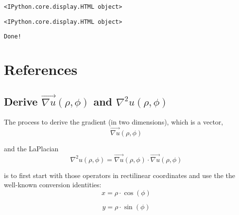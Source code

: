 \documentclass[11pt]{article}
\begin{document}
    
    
    \begin{Verbatim}[commandchars=\\\{\}]
<IPython.core.display.HTML object>
    \end{Verbatim}

    
    
    \begin{Verbatim}[commandchars=\\\{\}]
<IPython.core.display.HTML object>
    \end{Verbatim}

    
    \begin{Verbatim}[commandchars=\\\{\}]
Done!
    \end{Verbatim}

    \hypertarget{references}{%
\section{References}\label{references}}

    \hypertarget{derive-vecnabla-urho-phi-and-nabla2-urho-phi}{%
\subsection{\texorpdfstring{Derive \(\vec{\nabla u}(\rho, \phi)\) and
\(\nabla^2 u(\rho, \phi)\)}{Derive \textbackslash vec\{\textbackslash nabla u\}(\textbackslash rho, \textbackslash phi) and \textbackslash nabla\^{}2 u(\textbackslash rho, \textbackslash phi)}}\label{derive-vecnabla-urho-phi-and-nabla2-urho-phi}}

    The process to derive the gradient (in two dimensions), which is a
vector, \begin{equation}
\vec{\nabla u}(\rho,\phi)
\label{eq:eq1} \tag{1}
\end{equation}

and the LaPlacian \begin{equation}
\nabla^2 u(\rho,\phi) = \vec{\nabla u}(\rho,\phi) \cdot \vec{\nabla u}(\rho,\phi)
\label{eq:eq2} \tag{2}
\end{equation}

is to first start with those operators in rectilinear coordinates and
use the the well-known conversion identities: \begin{equation}
x = \rho \cdot \cos(\phi)
\label{eq:eq3a} \tag{3a}
\end{equation}

\begin{equation}
y = \rho \cdot \sin(\phi)
\label{eq:eq3b} \tag{3b}
\end{equation}
\end{document}

